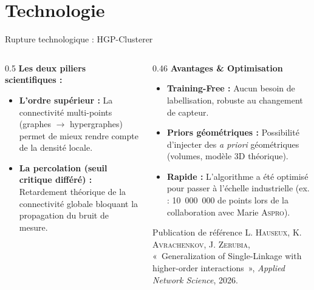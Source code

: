 \documentclass[A4,svgnames,9pt,aspectratio=169]{beamer}
\begin{document}
\section{Technologie}
\begin{frame}{Rupture technologique : HGP-Clusterer}
    \begin{columns}[T]
        \begin{column}{0.5\textwidth}
            \textbf{\bleu Les deux piliers scientifiques :}
            \begin{itemize}
                \item \textbf{L'ordre supérieur :} La connectivité multi-points (graphes $\rightarrow$ hypergraphes) permet de mieux rendre compte de la densité locale.
                \item \textbf{La percolation (seuil critique différé) :} Retardement théorique de la connectivité globale bloquant la propagation du bruit de mesure.
            \end{itemize}
        \end{column}
        
        \begin{column}{0.46\textwidth}
            \textbf{\orange Avantages \& Optimisation}
            \begin{itemize}
                \item \textbf{Training-Free :} Aucun besoin de labellisation, robuste au changement de capteur.
                \item \textbf{Priors géométriques :} Possibilité d'injecter des \emph{a priori} géométriques (volumes, modèle 3D théorique).
                \item \textbf{Rapide :} L'algorithme a été optimisé pour passer à l'échelle industrielle (ex. : 10~000~000 de points lors de la collaboration avec Marie \textsc{Aspro}).
            \end{itemize}
            
            \vspace{0.25cm}
            \begin{block}{Publication de référence}
                \scriptsize
                L. \textsc{Hauseux}, K. \textsc{Avrachenkov}, J. \textsc{Zerubia}, «~Generalization of Single-Linkage with higher-order interactions~», \emph{Applied Network Science}, 2026.
            \end{block}
        \end{column}
    \end{columns}
\end{frame}
\end{document}
